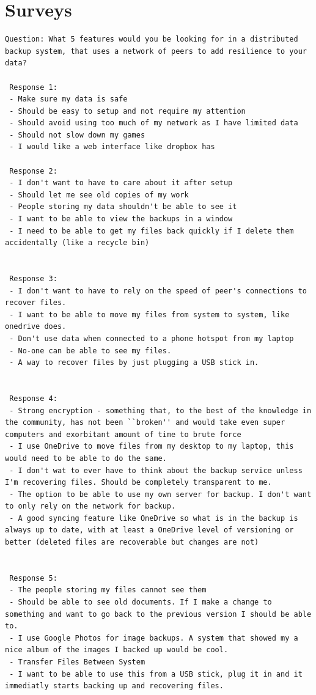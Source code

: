 \documentclass[11pt, a4paper, twocolumn, twoside]{report}
\begin{document}
\section{Surveys}

\begin{lstlisting}[language=RsT, caption=Membrane Feature Survey, label=lst:mbrnsurvey]
 Question: What 5 features would you be looking for in a distributed backup system, that uses a network of peers to add resilience to your data?
   
 Response 1:
 - Make sure my data is safe
 - Should be easy to setup and not require my attention
 - Should avoid using too much of my network as I have limited data
 - Should not slow down my games
 - I would like a web interface like dropbox has 
  
 Response 2:
 - I don't want to have to care about it after setup
 - Should let me see old copies of my work
 - People storing my data shouldn't be able to see it
 - I want to be able to view the backups in a window
 - I need to be able to get my files back quickly if I delete them accidentally (like a recycle bin)
 
  
 Response 3:
 - I don't want to have to rely on the speed of peer's connections to recover files.
 - I want to be able to move my files from system to system, like onedrive does.
 - Don't use data when connected to a phone hotspot from my laptop
 - No-one can be able to see my files.
 - A way to recover files by just plugging a USB stick in.
 
  
 Response 4:
 - Strong encryption - something that, to the best of the knowledge in the community, has not been ``broken'' and would take even super computers and exorbitant amount of time to brute force
 - I use OneDrive to move files from my desktop to my laptop, this would need to be able to do the same.
 - I don't wat to ever have to think about the backup service unless I'm recovering files. Should be completely transparent to me.
 - The option to be able to use my own server for backup. I don't want to only rely on the network for backup.
 - A good syncing feature like OneDrive so what is in the backup is always up to date, with at least a OneDrive level of versioning or better (deleted files are recoverable but changes are not)
 
  
 Response 5:
 - The people storing my files cannot see them
 - Should be able to see old documents. If I make a change to something and want to go back to the previous version I should be able to.
 - I use Google Photos for image backups. A system that showed my a nice album of the images I backed up would be cool.
 - Transfer Files Between System
 - I want to be able to use this from a USB stick, plug it in and it immediatly starts backing up and recovering files.
 

\end{lstlisting}
\end{document}
